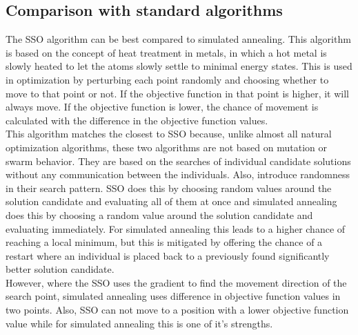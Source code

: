 \documentclass[runningheads]{llncs}
\begin{document}

\subsection{Comparison with standard algorithms}
The SSO algorithm can be best compared to simulated annealing. This algorithm is based on the concept of heat treatment in metals, in which a hot metal is slowly heated to let the atoms slowly settle to minimal energy states. This is used in optimization by perturbing each point randomly and choosing whether to move to that point or not. If the objective function in that point is higher, it will always move. If the objective function is lower, the chance of movement is calculated with the difference in the objective function values.\\
This algorithm matches the closest to SSO because, unlike almost all natural optimization algorithms, these two algorithms are not based on mutation or swarm behavior. They are based on the searches of individual candidate solutions without any communication between the individuals. Also, introduce randomness in their search pattern. SSO does this by choosing random values around the solution candidate and evaluating all of them at once and simulated annealing does this by choosing a random value around the solution candidate and evaluating immediately. For simulated annealing this leads to a higher chance of reaching a local minimum, but this is mitigated by offering the chance of a restart where an individual is placed back to a previously found significantly better solution candidate.\\
However, where the SSO uses the gradient to find the movement direction of the search point, simulated annealing uses difference in objective function values in two points. Also, SSO can not move to a position with a lower objective function value while for simulated annealing this is one of it's strengths.\\
\end{document}
